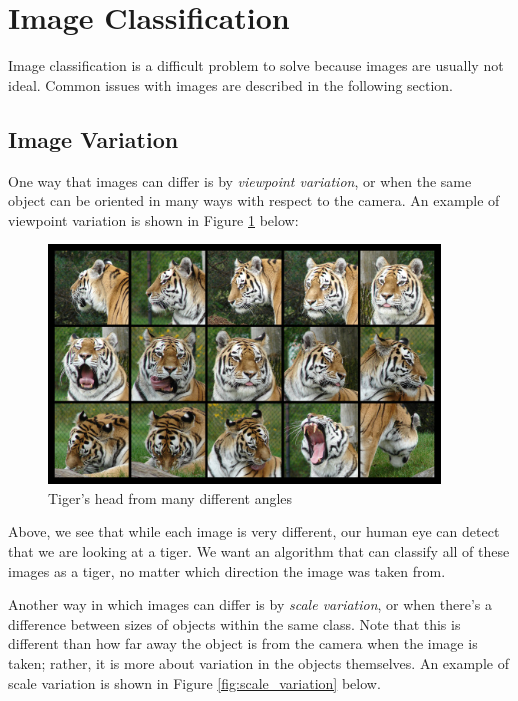 \newpage
\section{Image Classification}\label{ch:image_classification} Image
classification is a difficult problem to solve because images are usually not
ideal. Common issues with images are described in the
following section.

\subsection{Image Variation} One way that images can differ is by
\textit{viewpoint variation}, or when the same object can be oriented in many
ways with respect to the camera. An example of viewpoint variation is shown in
Figure \ref{fig:viewpoint} below:

\begin{figure}[ht!] \centering
\includegraphics[height=2.5in]{../figures/cat_viewpoint_variation.jpg}
\caption{Tiger's head from many different angles} \label{fig:viewpoint}
\end{figure}

\noindent Above, we see that while each image is very different, our human eye
can detect that we are looking at a tiger. We want an algorithm that can
classify all of these images as a tiger, no matter which direction the image
was taken from.

\noindent Another way in which images can differ is by \textit{scale
variation}, or when there's a difference between sizes of objects within the
same class. Note that this is different than how far away the object is from
the camera when the image is taken; rather, it is more about variation in the
objects themselves.  An example of scale variation is shown in Figure
\ref{fig:scale_variation} below.

\newpage


